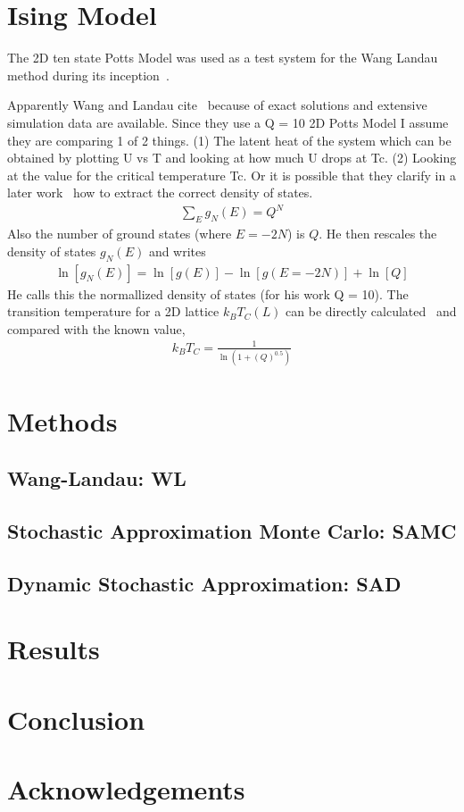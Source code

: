 \documentclass[letterpaper,twocolumn,amsmath,amssymb,pre,aps,10pt]{revtex4-1}
\begin{document}
\section{Ising Model}
The 2D ten state Potts Model was used as a test system for the Wang 
Landau method during its inception~\cite{wang2001determining,wang2001efficient}.

Apparently Wang and Landau cite~\cite{wu1982potts} because of exact solutions 
and extensive simulation data are available. Since they use a Q = 10 2D Potts
Model I assume they are comparing 1 of 2 things.
(1) The latent heat of the system which can be obtained by plotting U vs T
and looking at how much U drops at Tc.
(2) Looking at the value for the critical temperature Tc.
Or it is possible that they clarify in a later work~\cite{landau2004new} how
to extract the correct density of states. 
\begin{align}
\sum_E g_N\left( E\right)=Q^N
\end{align}
Also the number of ground states (where $E = -2N$) is $Q$. He then rescales
the density of states $g_N\left( E\right)$ and writes
\begin{align}
\ln \left[ g_N\left(E\right)\right]=\ln \left[ g\left( E\right)\right]
-\ln \left[ g\left(E=-2N\right)\right]+\ln\left[ Q \right]
\end{align}
He calls this the normallized density of states (for his work Q = 10). The
transition temperature for a 2D lattice $k_B T_C\left(L\right)$ can be directly
calculated~\cite{landau2004new} and compared with the known value,~\cite{wu1982potts}
\begin{align}
k_B T_C = \frac{1}{\ln\left(1+(Q)^0.5\right)}
\end{align}

\section{Methods}
\subsection{Wang-Landau: WL}

\subsection{Stochastic Approximation Monte Carlo: SAMC}

\subsection{Dynamic Stochastic Approximation: SAD}

\section{Results}
\section{Conclusion}
\section{Acknowledgements}

\maketitle


\end{document}
